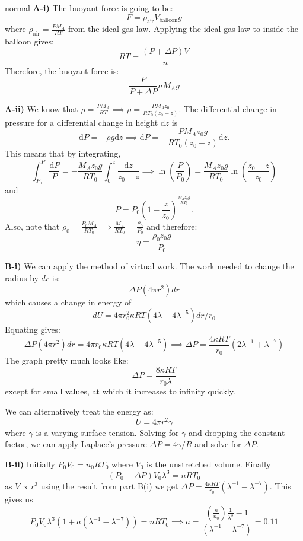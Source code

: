 \begin{solution}{normal}
\textbf{A-i)} The buoyant force is going to be: $$F=\rho_\text{air}V_\text{balloon}g$$
where $\rho_\text{air}=\frac{PM_A}{RT}$ from the ideal gas law. Applying the ideal gas law to inside the balloon gives:
$$RT = \frac{(P+\Delta P)V}{n}$$
Therefore, the buoyant force is:
$$\frac{P}{P+\Delta P}nM_Ag$$
\vspace{3mm}

\noindent \textbf{A-ii)} We know that $\rho = \frac{PM_{A}}{RT} \implies \rho = \frac{PM_Az_0}{RT_0(z_0-z)}$. The differential change in pressure for a differential change in height $\mathrm{d}z$ is $$\mathrm{d}P = -\rho g\mathrm{d}z \implies \mathrm{d}P = -\frac {PM_Az_0g}{RT_0(z_0-z)} \mathrm{d}z.$$
This means that by integrating,
$$\int_{P_0}^P \frac{\mathrm{d}P}{P} = -\frac {M_Az_0g}{RT_0} \int_0^z \frac{\mathrm{d}z}{z_0-z} \implies \ln \left(\frac{P}{P_0}\right) = \frac {M_Az_0g}{RT_0}\ln\left(\frac{z_0-z}{z_0}\right) $$
and
$$ P = P_0\left( 1 - \frac{z}{z_0}\right)^{\frac {M_A{z_0}g}{RT_0}}. $$
Also, note that $\rho_0 = \frac{P_0M_A}{RT_0} \implies \frac{M_A}{RT_0} = \frac{\rho_0}{P_0}$ and therefore:
$$\eta = \frac{\rho_0z_0g}{P_0}$$
\vspace{3mm}

\noindent \textbf{B-i)} We can apply the method of virtual work. The work needed to change the radius by $dr$ is:
$$\Delta P (4\pi r^2) dr$$which causes a change in energy of
$$dU = 4\pi r_0^2\kappa RT(4\lambda -4\lambda^{-5}) dr/r_0$$Equating gives:
$$\Delta P (4\pi r^2) dr = 4\pi r_0\kappa RT(4\lambda -4\lambda^{-5}) \implies \Delta P = \frac{4\kappa RT}{r_0}(2\lambda^{-1}+\lambda^{-7})$$The graph pretty much looks like:
$$\Delta P = \frac{8\kappa RT}{r_0\lambda}$$except for small values, at which it increases to infinity quickly.
\vspace{1.5mm}

\noindent We can alternatively treat the energy as:
$$U=4\pi r^2\gamma$$where $\gamma$ is a varying surface tension. Solving for $\gamma$ and dropping the constant factor, we can apply Laplace's pressure $\Delta P=4\gamma/R$ and solve for $\Delta P$.
\vspace{3mm}

\noindent \textbf{B-ii)} Initially $P_0V_0 = n_0RT_0$ where $V_0$ is the unstretched volume. Finally
$$(P_0+\Delta P)V_0\lambda^3 = nRT_0$$as $V \propto r^3$
using the result from part B(i) we get $\Delta P = \frac{4\kappa RT}{r_0}(\lambda^{-1}-\lambda^{-7}).$
This gives us 
$$ P_0V_0 \lambda^3 ( 1 + a (\lambda^{-1}-\lambda^{-7})) = nRT_0 \implies a = \frac{\left(\frac{n}{n_0}\right) \frac{1}{\lambda^3} - 1}{(\lambda^{-1}-\lambda^{-7})} = 0.11$$
\end{solution}